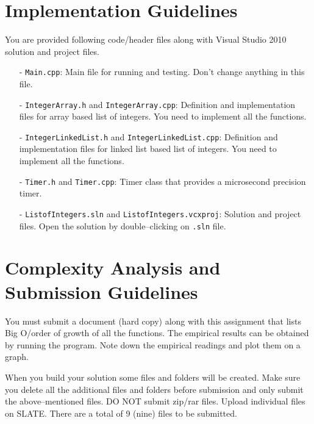 \documentclass[12pt,a4paper]{article}
\begin{document}
\section{Implementation Guidelines}
You are provided following code/header files along with Visual Studio 2010 solution and project files.
\begin{itemize}
\item[-] \verb|Main.cpp|: Main file for running and testing. Don't change anything in this file.
\item[-] \verb|IntegerArray.h| and \verb|IntegerArray.cpp|: Definition and implementation files for array based list of integers. You need to implement all the functions.
\item[-] \verb|IntegerLinkedList.h| and \verb|IntegerLinkedList.cpp|: Definition and implementation files for linked list based list of integers. You need to implement all the functions.
\item[-] \verb|Timer.h| and \verb|Timer.cpp|: Timer class that provides a microsecond precision timer.
\item[-] \verb|ListofIntegers.sln| and \verb|ListofIntegers.vcxproj|: Solution and project files. Open the solution by double--clicking on \verb|.sln| file.
\end{itemize}
\section{Complexity Analysis and Submission Guidelines}
You must submit a document (hard copy) along with this assignment that lists Big O/order of growth of all the functions. The empirical results can be obtained by running the program. Note down the empirical readings and plot them on a graph.

When you build your solution some files and folders will be created. Make sure you delete all the additional files and folders before submission and only submit the above--mentioned files. DO NOT submit zip/rar files. Upload individual files on SLATE. There are a total of 9 (nine) files to be submitted.
\end{document}
